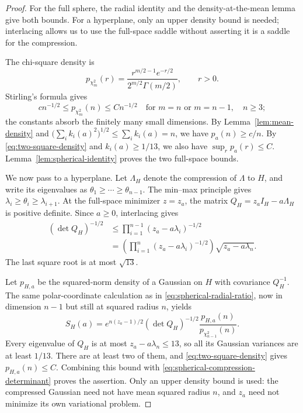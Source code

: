 \begin{proof}
For the full sphere, the radial identity and the density-at-the-mean
lemma give both bounds. For a hyperplane, only an upper density bound
is needed; interlacing allows us to use the full-space saddle without
asserting it is a saddle for the compression.

The chi-square density is
\[
 p_{\chi_m^2}(r)
 =\frac{r^{m/2-1}e^{-r/2}}{2^{m/2}\Gamma(m/2)},
 \qquad r>0.
\]
Stirling's formula gives
\[
 c n^{-1/2}\le p_{\chi_m^2}(n)\le C n^{-1/2}
 \quad\text{for }m=n\text{ or }m=n-1,\quad n\ge3;
\]
the constants absorb the finitely many small dimensions.
By Lemma~\ref{lem:mean-density} and
$\bigl(\sum_i k_i(a)^2\bigr)^{1/2}\le\sum_i k_i(a)=n$,
we have $p_a(n)\ge c/n$.
By \eqref{eq:two-square-density} and $k_i(a)\ge1/13$,
we also have $\sup_r p_a(r)\le C$.
Lemma~\ref{lem:spherical-identity} proves the two full-space bounds.

We now pass to a hyperplane. Let $\Lambda_H$ denote the compression
of $\Lambda$ to $H$, and write
its eigenvalues as $\theta_1\ge\cdots\ge\theta_{n-1}$.
The min--max principle gives
$\lambda_i\ge\theta_i\ge\lambda_{i+1}$.
At the full-space minimizer $z=z_a$, the matrix
$Q_H=z_a I_H-a\Lambda_H$ is positive definite.  Since $a\ge0$,
interlacing gives
\begin{equation}
\label{eq:spherical-compression-determinant}
 \begin{split}
 (\det Q_H)^{-1/2}
 &\le\prod_{i=1}^{n-1}(z_a-a\lambda_i)^{-1/2}\\
 &=\left(\prod_{i=1}^n(z_a-a\lambda_i)^{-1/2}\right)
   \sqrt{z_a-a\lambda_n}.
 \end{split}
\end{equation}
The last square root is at most $\sqrt{13}$.

Let $p_{H,a}$ be the squared-norm density of a Gaussian on $H$ with
covariance $Q_H^{-1}$.  The same polar-coordinate calculation as in
\eqref{eq:spherical-radial-ratio}, now in dimension $n-1$ but still
at squared radius $n$, yields
\[
 S_H(a)
 =e^{n(z_a-1)/2}(\det Q_H)^{-1/2}
   \frac{p_{H,a}(n)}{p_{\chi_{n-1}^2}(n)}.
\]
Every eigenvalue of $Q_H$ is at most
$z_a-a\lambda_n\le13$, so all its Gaussian variances are at least
$1/13$.  There are at least two of them, and
\eqref{eq:two-square-density} gives $p_{H,a}(n)\le C$.
Combining this bound with
\eqref{eq:spherical-compression-determinant} proves the assertion.
Only an upper density bound is used: the compressed Gaussian need
not have mean squared radius $n$, and $z_a$ need not minimize its
own variational problem.
\end{proof}

